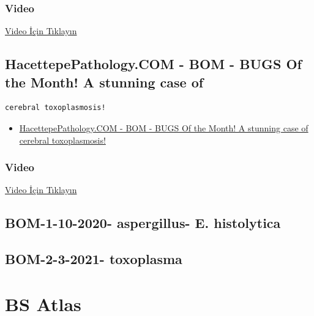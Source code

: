 \documentclass[
  letterpaper,
  DIV=11,
  numbers=noendperiod]{scrreprt}
\providecommand{\tightlist}{%
  \setlength{\itemsep}{0pt}\setlength{\parskip}{0pt}}\usepackage{longtable,booktabs,array}
\begin{document}
\hypertarget{video-40}{%
\subsection{Video}\label{video-40}}

\href{https://www.youtube.com/watch?v=hF7jSmHiiYQ}{Video İçin Tıklayın}

\hypertarget{hacettepepathology.com---bom---bugs-of-the-month-a-stunning-case-of}{%
\section{HacettepePathology.COM - BOM - BUGS Of the Month! A stunning
case
of}\label{hacettepepathology.com---bom---bugs-of-the-month-a-stunning-case-of}}

\begin{verbatim}
cerebral toxoplasmosis!
\end{verbatim}

\begin{itemize}
\tightlist
\item
  \href{https://www.youtube.com/watch?v=7JOOmePPtXI\&ab_channel=KemalKosemehmetoglu}{HacettepePathology.COM
  - BOM - BUGS Of the Month! A stunning case of cerebral toxoplasmosis!}
\end{itemize}

\hypertarget{video-41}{%
\subsection{Video}\label{video-41}}

\href{https://www.youtube.com/watch?v=7JOOmePPtXI}{Video İçin Tıklayın}

\hypertarget{bom-1-10-2020--aspergillus--e.-histolytica}{%
\section{BOM-1-10-2020- aspergillus- E.
histolytica}\label{bom-1-10-2020--aspergillus--e.-histolytica}}

\hypertarget{bom-2-3-2021--toxoplasma}{%
\section{BOM-2-3-2021- toxoplasma}\label{bom-2-3-2021--toxoplasma}}

\hypertarget{bs-atlas}{%
\chapter{BS Atlas}\label{bs-atlas}}
\end{document}
